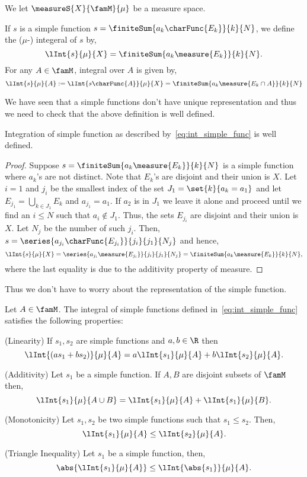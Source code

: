 We let $\measureS{X}{\famM}{\mu}$ be a measure space.
\begin{Definition}
    If $s$ is a simple function $s = \finiteSum{a_k\charFunc{E_k}}{k}{N}$,
    we define the ($\mu$-) integeral of $s$ by,
    \begin{equation}\label{eq:int_simple_func}
	\lInt{s}{\mu}{X} = \finiteSum{a_k\measure{E_k}}{k}{N}.
    \end{equation}
    For any $A \in \famM$, integral over $A$ is given by,
    \begin{equation}
	\lInt{s}{\mu}{A} := \lInt{s\charFunc{A}}{\mu}{X} = \finiteSum{a_k\measure{E_k\cap A}}{k}{N}
    \end{equation}
\end{Definition}
We have seen that a simple functions don't have unique representation and thus we need to check 
that the above definition is well defined.
\begin{Proposition}
    Integration of simple function as described by~\ref{eq:int_simple_func} is well defined.
\end{Proposition}
\begin{proof}
    Suppose $s = \finiteSum{a_k\measure{E_k}}{k}{N}$ is a simple function where $a_k$'s are not distinct. Note
    that $E_k$'s are disjoint and their union is $X$. Let $i = 1$ and $j_i$ be the smallest index of the set 
    $J_1 = \set{k}{a_k = a_1}$ and let $E_{j_1} = \bigcup\limits_{k\in J_1}E_k$ and $a_{j_1} = a_1$. If $a_2$
    is in $J_1$ we leave it alone and proceed until we find an $i \leq N$ such that $a_i \not \in J_1$. Thus,
    the sets $E_{j_i}$ are disjoint and their union is $X$. Let $N_j$ be the number of such $j_i$.  
    Then,
    $s = \series{a_{j_i}\charFunc{E_{j_i}}}{j_i}{j_1}{N_j}$ and hence,
    \[\lInt{s}{\mu}{X} = \series{a_{j_i}\measure{E_{j_i}}}{j_i}{j_1}{N_j} = 
	\finiteSum{a_{k}\measure{E_k}}{k}{N}, \]
    where the last equality is due to the additivity property of measure.
\end{proof}
Thus we don't have to worry about the representation of the simple function.
\begin{Proposition}[name=Properites of integral of simple functions]\label{prop:prop_int_simp_func}
    Let $A \in \famM$. 
    The integral of simple functions defined in~\ref{eq:int_simple_func} satisfies the following properties:
    \begin{properties}
    \item
	(Linearity) If $s_1,s_2$ are simple functions and $a,b \in \R$ then
	\[\lInt{(as_1 + bs_2)}{\mu}{A} = a\lInt{s_1}{\mu}{A} + b\lInt{s_2}{\mu}{A}.\]
    \item
	(Additivity) Let $s_1$ be a simple function. If $A,B$ are disjoint subsets of $\famM$ then,
	\[\lInt{s_1}{\mu}{A\cup B} = \lInt{s_1}{\mu}{A} + \lInt{s_1}{\mu}{B}.\]
    \item
	(Monotonicity) Let $s_1,s_2$ be two simple functions such that $s_1\leq s_2$. Then,
	\[\lInt{s_1}{\mu}{A} \leq \lInt{s_2}{\mu}{A}.\]
    \item
	(Triangle Inequality) Let $s_1$ be a simple function, then,
	\[\abs{\lInt{s_1}{\mu}{A}} \leq \lInt{\abs{s_1}}{\mu}{A}.\]
    \end{properties}
\end{Proposition}
